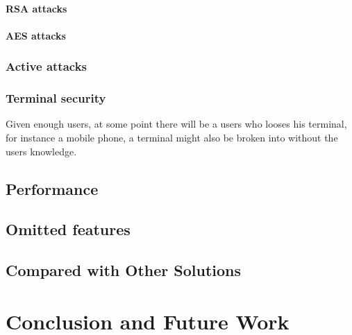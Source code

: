 \documentclass[pdftex,english,10pt,b5paper,twoside]{book}
\begin{document}
\subsubsection{RSA attacks}

\subsubsection{AES attacks}

\subsection{Active attacks}


\subsection{Terminal security}
Given enough users, at some point there will be a users who looses his
terminal, for instance a mobile phone, a terminal might also be broken into
without the users knowledge.

\section{Performance}

\section{Omitted features}

\section{Compared with Other Solutions}
\chapter{Conclusion and Future Work}




\appendix
\appendixpage
\addappheadtotoc
\end{document}
